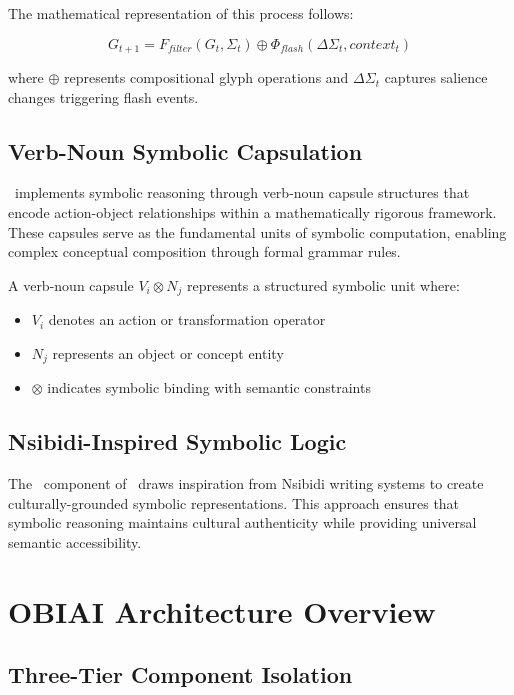 \documentclass[12pt,twoside,openright]{report}
\begin{document}
The mathematical representation of this process follows:

\begin{equation}
G_{t+1} = F_{filter}(G_t, \Sigma_t) \oplus \Phi_{flash}(\Delta\Sigma_t, context_t)
\end{equation}

where $\oplus$ represents compositional glyph operations and $\Delta\Sigma_t$ captures salience changes triggering flash events.

\section{Verb-Noun Symbolic Capsulation}

\obiai\ implements symbolic reasoning through verb-noun capsule structures that encode action-object relationships within a mathematically rigorous framework. These capsules serve as the fundamental units of symbolic computation, enabling complex conceptual composition through formal grammar rules.

\begin{definition}
A verb-noun capsule $V_i \otimes N_j$ represents a structured symbolic unit where:
\begin{itemize}
\item $V_i$ denotes an action or transformation operator
\item $N_j$ represents an object or concept entity
\item $\otimes$ indicates symbolic binding with semantic constraints
\end{itemize}
\end{definition}

\section{Nsibidi-Inspired Symbolic Logic}

The \csl\ component of \obiai\ draws inspiration from Nsibidi writing systems to create culturally-grounded symbolic representations. This approach ensures that symbolic reasoning maintains cultural authenticity while providing universal semantic accessibility.

\chapter{OBIAI Architecture Overview}

\section{Three-Tier Component Isolation}
\end{document}
